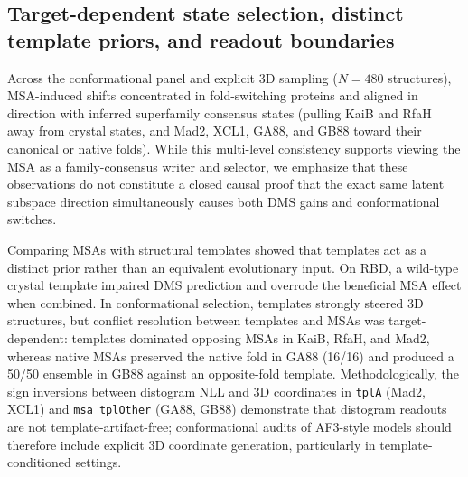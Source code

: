 \documentclass[10pt,a4paper]{article}
\begin{document}
\subsection{Target-dependent state selection, distinct template priors, and readout boundaries}
Across the conformational panel and explicit 3D sampling ($N=480$ structures), MSA-induced shifts concentrated in fold-switching proteins and aligned in direction with inferred superfamily consensus states (pulling KaiB and RfaH away from crystal states, and Mad2, XCL1, GA88, and GB88 toward their canonical or native folds). While this multi-level consistency supports viewing the MSA as a family-consensus writer and selector, we emphasize that these observations do not constitute a closed causal proof that the exact same latent subspace direction simultaneously causes both DMS gains and conformational switches.

Comparing MSAs with structural templates showed that templates act as a distinct prior rather than an equivalent evolutionary input. On RBD, a wild-type crystal template impaired DMS prediction and overrode the beneficial MSA effect when combined. In conformational selection, templates strongly steered 3D structures, but conflict resolution between templates and MSAs was target-dependent: templates dominated opposing MSAs in KaiB, RfaH, and Mad2, whereas native MSAs preserved the native fold in GA88 (16/16) and produced a 50/50 ensemble in GB88 against an opposite-fold template. Methodologically, the sign inversions between distogram NLL and 3D coordinates in \texttt{tplA} (Mad2, XCL1) and \texttt{msa\_tplOther} (GA88, GB88) demonstrate that distogram readouts are not template-artifact-free; conformational audits of AF3-style models should therefore include explicit 3D coordinate generation, particularly in template-conditioned settings.
\end{document}
